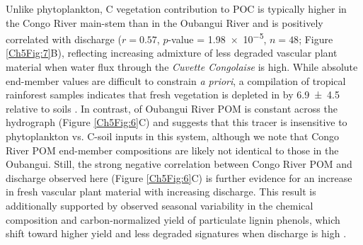 Unlike phytoplankton, C vegetation contribution to POC is typically higher in the Congo River main-stem than in the Oubangui River and is positively correlated with discharge ($r = 0.57$, $p$-value = \num{1.98e-5}, $n = 48$; Figure \ref{Ch5Fig:7}B), reflecting increasing admixture of less degraded vascular plant material when water flux through the \textit{Cuvette Congolaise} is high. While absolute end-member  values are difficult to constrain \textit{a priori}, a compilation of tropical rainforest samples indicates that fresh vegetation is depleted in  by \SI{6.9 \pm 4.5}{\permil} relative to soils \citep{Martinelli:1999ta}. In contrast,  of Oubangui River POM is constant across the hydrograph (Figure \ref{Ch5Fig:6}C) and suggests that this tracer is insensitive to phytoplankton vs. C-soil inputs in this system, although we note that Congo River POM end-member compositions are likely not identical to those in the Oubangui. Still, the strong negative correlation between Congo River POM  and discharge observed here (Figure \ref{Ch5Fig:6}C) is further evidence for an increase in fresh vascular plant material with increasing discharge. This result is additionally supported by observed seasonal variability in the chemical composition and carbon-normalized yield of particulate lignin phenols, which shift toward higher yield and less degraded signatures when discharge is high \citep{Spencer:2016ho}.

